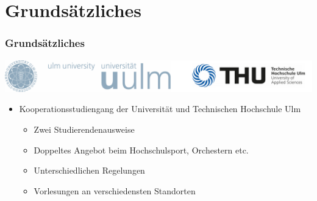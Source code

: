 \documentclass[10pt,a4paper]{beamer}
\begin{document}
\section{Grundsätzliches}
\begin{frame}
\frametitle{Grundsätzliches}
\begin{center}
\includegraphics[width=0.7\paperwidth]{Logos.png}
\end{center}
\vspace{0.3cm}
	\begin{itemize}
		\item Kooperationsstudiengang der Universität und Technischen Hochschule Ulm
		\begin{itemize}
			\setlength{\itemsep}{10pt} %
			\item Zwei Studierendenausweise
			\item Doppeltes Angebot beim Hochschulsport, Orchestern etc.
			\item Unterschiedlichen Regelungen
			\item Vorlesungen an verschiedensten Standorten
		\end{itemize}
	\end{itemize}
\end{frame}

\begin{frame}
\begin{center}
    \end{center}
\end{frame}
\end{document}
